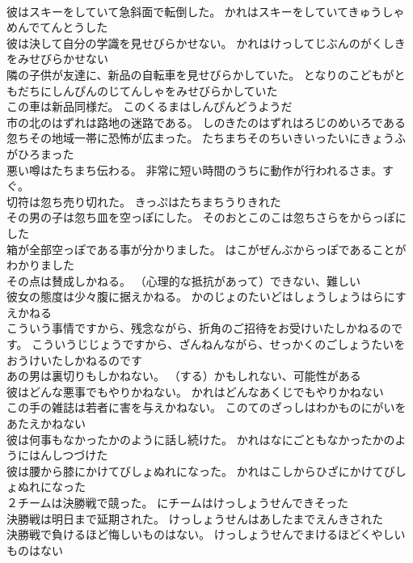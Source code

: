 \documentclass[8pt]{extreport}
\begin{document}
\begin{CJK}{UTF8}{min}
\\	彼はスキーをしていて急斜面で転倒した。	かれはスキーをしていてきゅうしゃめんでてんとうした 
\\	彼は決して自分の学識を見せびらかせない。	かれはけっしてじぶんのがくしきをみせびらかせない 
\\	隣の子供が友達に、新品の自転車を見せびらかしていた。	となりのこどもがともだちにしんぴんのじてんしゃをみせびらかしていた 
\\	この車は新品同様だ。	このくるまはしんぴんどうようだ 
\\	市の北のはずれは路地の迷路である。	しのきたのはずれはろじのめいろである 
\\	忽ちその地域一帯に恐怖が広まった。	たちまちそのちいきいったいにきょうふがひろまった 
\\	悪い噂はたちまち伝わる。	非常に短い時間のうちに動作が行われるさま。すぐ。
\\	切符は忽ち売り切れた。	きっぷはたちまちうりきれた 
\\	その男の子は忽ち皿を空っぽにした。	そのおとこのこは忽ちさらをからっぽにした 
\\	箱が全部空っぽである事が分かりました。	はこがぜんぶからっぽであることがわかりました 
\\	その点は賛成しかねる。	（心理的な抵抗があって）できない、難しい
\\	彼女の態度は少々腹に据えかねる。	かのじょのたいどはしょうしょうはらにすえかねる 
\\	こういう事情ですから、残念ながら、折角のご招待をお受けいたしかねるのです。	こういうじじょうですから、ざんねんながら、せっかくのごしょうたいをおうけいたしかねるのです 
\\	あの男は裏切りもしかねない。	（する）かもしれない、可能性がある
\\	彼はどんな悪事でもやりかねない。	かれはどんなあくじでもやりかねない 
\\	この手の雑誌は若者に害を与えかねない。	このてのざっしはわかものにがいをあたえかねない 
\\	彼は何事もなかったかのように話し続けた。	かれはなにごともなかったかのようにはんしつづけた 
\\	彼は腰から膝にかけてびしょぬれになった。	かれはこしからひざにかけてびしょぬれになった 
\\	２チームは決勝戦で競った。	にチームはけっしょうせんできそった 
\\	決勝戦は明日まで延期された。	けっしょうせんはあしたまでえんきされた 
\\	決勝戦で負けるほど悔しいものはない。	けっしょうせんでまけるほどくやしいものはない 

\end{CJK}
\end{document}
